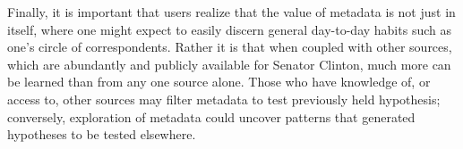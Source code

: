 \documentclass[journal]{vgtc}                %
\begin{document}
Finally, it is important that users realize that the value of metadata is not just in itself, where one might expect to easily discern general day-to-day habits such as one's circle of correspondents.  Rather it is that when coupled with other sources, which are abundantly and publicly available for Senator Clinton, much more can be learned than from any one source alone.  Those who have knowledge of, or access to, other sources may filter metadata to test previously held hypothesis; conversely, exploration of metadata could uncover patterns that generated hypotheses to be tested elsewhere. 


\newpage
$~~~$
\newpage


%
%
%
%


\end{document}
